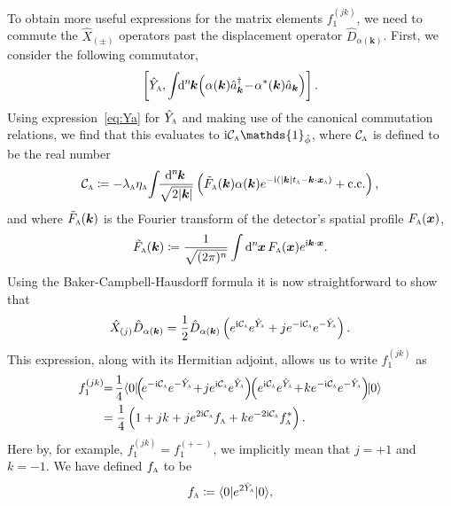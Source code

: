 \documentclass[pra,nofootinbib,floats,aps,twocolumn,tightenlines,superscriptaddress]{revtex4-1}
\renewcommand*\d[2][]{%
	\mathrm{d}%
	\ifx\relax#1\relax\else
	\rule{-0.02em}{1.5ex}^{#1}\rule{0.08em}{0ex}\!
	\fi
	#2\,
}
\newcommand{\ket}[1]{| {#1} \rangle}
\newcommand{\bra}[1]{\langle {#1} |}
\newcommand{\ii}{\mathrm{i}}
\renewcommand{\a}[1]{\hat{a}_{\bm{#1}}}
\newcommand{\ad}[1]{\hat{a}_{\bm{#1}}^\dagger}
\newcommand{\Ya}{\hat{Y}_\textsc{a}}
\newcommand{\disp}{\hat{D}_{\alpha(\bm{k})}}
\newcommand{\ca}{\mathcal{C}_\textsc{a}}
\begin{document}
To obtain more useful expressions for the matrix elements $f_1^{(jk)}$, we need to commute the $\hat{X}_{(\pm)}$ operators past the displacement operator $\disp$. First, we consider the following commutator,
\begin{equation}
    \left[
    \Ya,
    \int\!\!\d[n]{\bm{k}}\!\!\left(\alpha(\bm{k})\ad{k}
	\!-\!
	\alpha^*(\bm{k})\a{k}\right)
	\right].
\end{equation}
Using expression~\eqref{eq:Ya} for $\Ya$ and making use of the canonical commutation relations, we find that this evaluates to $\ii\mathcal{C}_\textsc{a}\mathds{1}_{\hat{\phi}}$, where $\mathcal{C}_\textsc{a}$ is defined to be the real number
\begin{align}
\label{eq:c_a}
    \mathcal{C}_\textsc{a}
    \coloneqq
    -\lambda_\textsc{a}
    \eta_\textsc{a}\!
    \int\!\!
    \frac{\d[n]{\bm k}} {\sqrt{2|\bm{k}|}}
    \left(
    \tilde{F}_\textsc{a}(\bm k)
    \alpha(\bm k)
    e^{-\ii(|\bm k|t_\textsc{a} -\bm{k}\cdot \bm{x}_\textsc{a})}
    +\text{c.c.}
    \right),
\end{align}
and where $\tilde{F}_\textsc{a}(\bm k)$ is the Fourier transform of the detector's spatial profile $F_\textsc{a}(\bm x)$,
\begin{equation}
\label{eq:FT}
	\tilde{F}_\textsc{a}(\bm{k})
	\coloneqq
	\frac{1}{\sqrt{(2\pi)^n}}\int\d[n]{\bm{x}}
	F_\textsc{a}(\bm{x})e^{\ii\bm{k}\cdot\bm{x}}.
\end{equation}
Using the Baker-Campbell-Hausdorff formula it is now straightforward to show that
\begin{equation}
    \hat{X}_{(j)} \disp
    =
    \frac{1}{2}\disp
    \left(
    e^{\ii\ca}e^{\Ya} +j
    e^{-\ii\ca}e^{-\Ya}
    \right).
\end{equation}
This expression, along with its Hermitian adjoint, allows us to write $f_1^{(jk)}$ as
\begin{align}
\label{eq:f_v2}
    f_1^{(jk)}
    \!\!&=
    \!\frac{1}{4}
    \bra{0}\!\!
    \left(\!
    e^{-\ii\ca}e^{-\Ya}
    \!+\!j e^{\ii\ca}e^{\Ya}
    \right)\!\!
    \left(
    e^{\ii\ca}e^{\Ya}
    \!+\!k e^{-\ii\ca}e^{-\Ya}
    \right)\!\!
    \ket{0}
    \notag\\
    &=
    \frac{1}{4}
    \left(
    1+jk
    +je^{2\ii\ca}f_\textsc{a}
    +ke^{-2\ii\ca}f_\textsc{a}^*
    \right).
\end{align}
Here by, for example, $f_1^{(jk)}=f_1^{(+-)}$, we implicitly mean that $j=+1$ and $k=-1$. We have defined $f_\textsc{a}$ to be
\begin{equation}
\label{eq:fa}
    f_\textsc{a}
    \coloneqq
    \bra{0}e^{2\Ya}\ket{0},
\end{equation}
\end{document}
